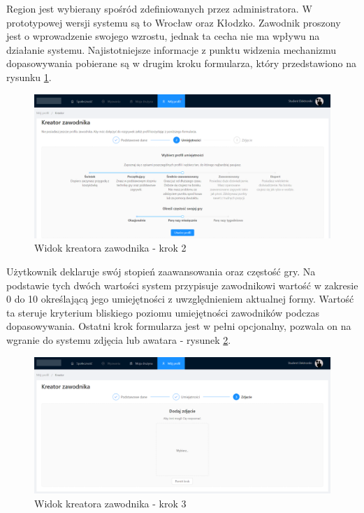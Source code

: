 Region jest wybierany spośród zdefiniowanych przez administratora. W prototypowej wersji systemu są to Wrocław oraz Kłodzko. Zawodnik proszony jest o wprowadzenie swojego wzrostu, jednak ta cecha nie ma wpływu na działanie systemu. Najistotniejsze informacje z punktu widzenia mechanizmu dopasowywania pobierane są w drugim kroku formularza, który przedstawiono na rysunku \ref{fig:ss-profile-2}.

\begin{figure}[H]
\centering
\includegraphics[width=\linewidth]{065-dzialanie/rys/ss-profile-2.PNG}
\caption{Widok kreatora zawodnika - krok 2}
\label{fig:ss-profile-2}
\end{figure}

Użytkownik deklaruje swój stopień zaawansowania oraz częstość gry. Na podstawie tych dwóch wartości system przypisuje zawodnikowi wartość w zakresie 0 do 10 określającą jego umiejętności z uwzględnieniem aktualnej formy. Wartość ta steruje kryterium bliskiego poziomu umiejętności zawodników podczas dopasowywania. Ostatni krok formularza jest w pełni opcjonalny, pozwala on na wgranie do systemu zdjęcia lub awatara - rysunek \ref{fig:ss-profile-3}.

\begin{figure}[H]
\centering
\includegraphics[width=\linewidth]{065-dzialanie/rys/ss-profile-3.PNG}
\caption{Widok kreatora zawodnika - krok 3}
\label{fig:ss-profile-3}
\end{figure}


